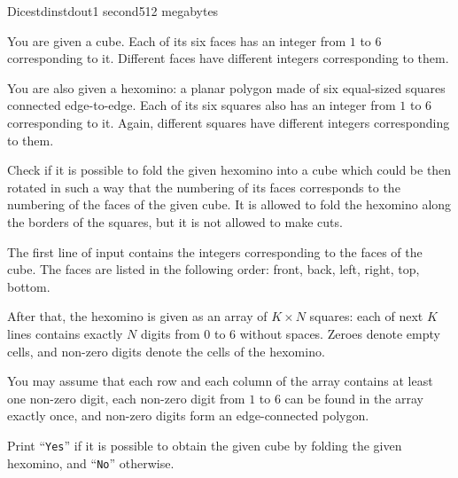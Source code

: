 \begin{problem}{Dice}{stdin}{stdout}{1 second}{512 megabytes}

You are given a cube.
Each of its six faces has an integer from $1$ to $6$ corresponding to it.
Different faces have different integers corresponding to them.

You are also given a hexomino: a planar polygon made of six equal-sized squares connected edge-to-edge.
Each of its six squares also has an integer from $1$ to $6$ corresponding to it.
Again, different squares have different integers corresponding to them.

Check if it is possible to fold the given hexomino into a cube which could be then rotated in such a way that the numbering of its faces corresponds to the numbering of the faces of the given cube.
It is allowed to fold the hexomino along the borders of the squares, but it is not allowed to make cuts.


\InputFile
The first line of input contains the integers corresponding to the faces of the cube.
The faces are listed in the following order: front, back, left, right, top, bottom.

After that, the hexomino is given as an array of $K \times N$ squares:
each of next $K$ lines contains exactly $N$ digits from $0$ to $6$ without spaces.
Zeroes denote empty cells, and non-zero digits denote the cells of the hexomino.

You may assume that each row and each column of the array contains at least one non-zero digit, each non-zero digit from $1$ to $6$ can be found in the array exactly once, and non-zero digits form an edge-connected polygon.


\OutputFile
Print ``\texttt{Yes}'' if it is possible to obtain the given cube by folding the given hexomino, and ``\texttt{No}'' otherwise.


\Examples

\begin{example}
%
%
\end{example}

\end{problem}
